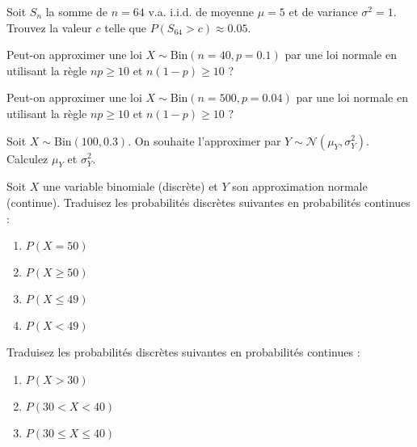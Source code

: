 \begin{exercicebox}
Soit $S_n$ la somme de $n=64$ v.a. i.i.d. de moyenne $\mu=5$ et de variance $\sigma^2=1$.
Trouvez la valeur $c$ telle que $P(S_{64} > c) \approx 0.05$.
\end{exercicebox}


\begin{exercicebox}
Peut-on approximer une loi $X \sim \text{Bin}(n=40, p=0.1)$ par une loi normale en utilisant la règle $np \ge 10$ et $n(1-p) \ge 10$ ?
\end{exercicebox}

\begin{exercicebox}
Peut-on approximer une loi $X \sim \text{Bin}(n=500, p=0.04)$ par une loi normale en utilisant la règle $np \ge 10$ et $n(1-p) \ge 10$ ?
\end{exercicebox}

\begin{exercicebox}
Soit $X \sim \text{Bin}(100, 0.3)$. On souhaite l'approximer par $Y \sim \mathcal{N}(\mu_Y, \sigma_Y^2)$.
Calculez $\mu_Y$ et $\sigma_Y^2$.
\end{exercicebox}

\begin{exercicebox}
Soit $X$ une variable binomiale (discrète) et $Y$ son approximation normale (continue).
Traduisez les probabilités discrètes suivantes en probabilités continues :
\begin{enumerate}
    \item $P(X = 50)$
    \item $P(X \ge 50)$
    \item $P(X \le 49)$
    \item $P(X < 49)$
\end{enumerate}
\end{exercicebox}

\begin{exercicebox}
Traduisez les probabilités discrètes suivantes en probabilités continues :
\begin{enumerate}
    \item $P(X > 30)$
    \item $P(30 < X < 40)$
    \item $P(30 \le X \le 40)$
\end{enumerate}
\end{exercicebox}

